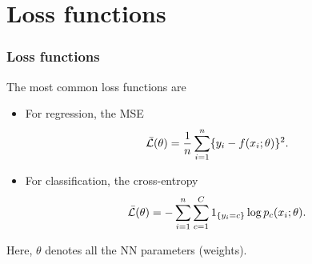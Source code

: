 \section{Loss functions}
\begin{frame}
\frametitle{Loss functions}
The most common loss functions are
\begin{itemize}
\item For regression, the MSE
$$
\bar{\cal L}(\theta) = \frac{1}{n} \sum_{i=1}^n \{y_i - f(x_i;\theta)\}^2.
$$
\item For classification, the cross-entropy
$$
\bar{\cal L}(\theta) = -\sum_{i=1}^n \sum_{c=1}^C 1_{\{y_i=c\}} \log p_c(x_i;\theta).
$$
\end{itemize}
Here, $\theta$ denotes all the NN parameters (weights). 
\end{frame}
